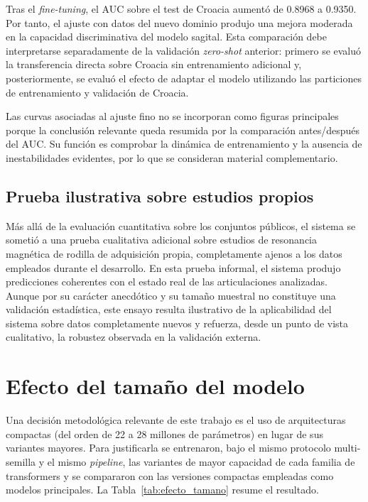 Tras el \textit{fine-tuning}, el AUC sobre el test de Croacia aumentó de 0.8968 a 0.9350. Por tanto, el ajuste con datos del nuevo dominio produjo una mejora moderada en la capacidad discriminativa del modelo sagital. Esta comparación debe interpretarse separadamente de la validación \textit{zero-shot} anterior: primero se evaluó la transferencia directa sobre Croacia sin entrenamiento adicional y, posteriormente, se evaluó el efecto de adaptar el modelo utilizando las particiones de entrenamiento y validación de Croacia.

Las curvas asociadas al ajuste fino no se incorporan como figuras principales porque la conclusión relevante queda resumida por la comparación antes/después del AUC. Su función es comprobar la dinámica de entrenamiento y la ausencia de inestabilidades evidentes, por lo que se consideran material complementario.

\subsection{Prueba ilustrativa sobre estudios propios}

Más allá de la evaluación cuantitativa sobre los conjuntos públicos, el sistema se sometió a una prueba cualitativa adicional sobre estudios de resonancia magnética de rodilla de adquisición propia, completamente ajenos a los datos empleados durante el desarrollo. En esta prueba informal, el sistema produjo predicciones coherentes con el estado real de las articulaciones analizadas. Aunque por su carácter anecdótico y su tamaño muestral no constituye una validación estadística, este ensayo resulta ilustrativo de la aplicabilidad del sistema sobre datos completamente nuevos y refuerza, desde un punto de vista cualitativo, la robustez observada en la validación externa.


\section{Efecto del tamaño del modelo}
\label{subsec:efecto_tamano}

Una decisión metodológica relevante de este trabajo es el uso de arquitecturas compactas (del orden de 22 a 28 millones de parámetros) en lugar de sus variantes mayores. Para justificarla se entrenaron, bajo el mismo protocolo multi-semilla y el mismo \textit{pipeline}, las variantes de mayor capacidad de cada familia de transformers y se compararon con las versiones compactas empleadas como modelos principales. La Tabla~\ref{tab:efecto_tamano} resume el resultado.

